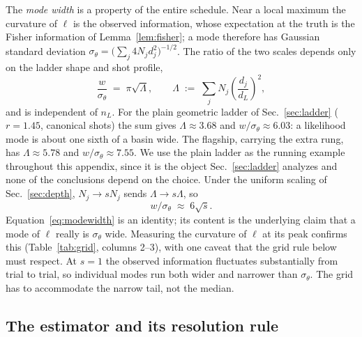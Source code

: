 \documentclass[%
 twocolumn,
 amsmath,amssymb,
prx,
longbibliography
]{revtex4-2}
\begin{document}
The \emph{mode width} is a property of the entire schedule. Near a local maximum the curvature of $\ell$ is the observed information, whose expectation at the truth is the Fisher information of Lemma~\ref{lem:fisher}; a mode therefore has Gaussian standard deviation $\sigma_\theta = \big(\sum_j 4 N_j d_j^2\big)^{-1/2}$. The ratio of the two scales depends only on the ladder shape and shot profile,
\begin{equation}\label{eq:modewidth}
    \frac{w}{\sigma_\theta} \;=\; \pi\sqrt{\Lambda}, \qquad
    \Lambda \;:=\; \sum_j N_j \left(\frac{d_j}{d_L}\right)^{\!2},
\end{equation}
and is independent of $n_L$. For the plain geometric ladder of Sec.~\ref{sec:ladder} ($r = 1.45$, canonical shots) the sum gives $\Lambda \approx 3.68$ and $w/\sigma_\theta \approx 6.03$: a likelihood mode is about one sixth of a basin wide. The flagship, carrying the extra rung, has $\Lambda \approx 5.78$ and $w/\sigma_\theta \approx 7.55$. We use the plain ladder as the running example throughout this appendix, since it is the object Sec.~\ref{sec:ladder} analyzes and none of the conclusions depend on the choice. Under the uniform scaling of Sec.~\ref{sec:depth}, $N_j \to s N_j$ sends $\Lambda \to s\Lambda$, so
\begin{equation}\label{eq:modescale}
    w/\sigma_\theta \;\approx\; 6\sqrt{s}.
\end{equation}
Equation~\eqref{eq:modewidth} is an identity; its content is the underlying claim that a mode of $\ell$ really is $\sigma_\theta$ wide. Measuring the curvature of $\ell$ at its peak confirms this (Table~\ref{tab:grid}, columns 2--3), with one caveat that the grid rule below must respect. At $s = 1$ the observed information fluctuates substantially from trial to trial, so individual modes run both wider and narrower than $\sigma_\theta$. The grid has to accommodate the narrow tail, not the median.

\subsection{The estimator and its resolution rule}\label{app:algorithm}
\end{document}
